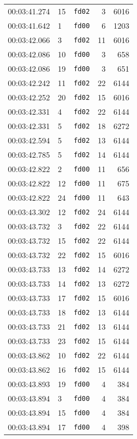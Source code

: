 \documentclass{article}
\begin{document}
\begin{longtable}{lllrr}
00:03:41.274 & 15 & \texttt{fd02} & 3 & 6016 \\
00:03:41.642 & 1 & \texttt{fd00} & 6 & 1203 \\
00:03:42.066 & 3 & \texttt{fd02} & 11 & 6016 \\
00:03:42.086 & 10 & \texttt{fd00} & 3 & 658 \\
00:03:42.086 & 19 & \texttt{fd00} & 3 & 651 \\
00:03:42.242 & 11 & \texttt{fd02} & 22 & 6144 \\
00:03:42.252 & 20 & \texttt{fd02} & 15 & 6016 \\
00:03:42.331 & 4 & \texttt{fd02} & 22 & 6144 \\
00:03:42.331 & 5 & \texttt{fd02} & 18 & 6272 \\
00:03:42.594 & 5 & \texttt{fd02} & 13 & 6144 \\
00:03:42.785 & 5 & \texttt{fd02} & 14 & 6144 \\
00:03:42.822 & 2 & \texttt{fd00} & 11 & 656 \\
00:03:42.822 & 12 & \texttt{fd00} & 11 & 675 \\
00:03:42.822 & 24 & \texttt{fd00} & 11 & 643 \\
00:03:43.302 & 12 & \texttt{fd02} & 24 & 6144 \\
00:03:43.732 & 3 & \texttt{fd02} & 22 & 6144 \\
00:03:43.732 & 15 & \texttt{fd02} & 22 & 6144 \\
00:03:43.732 & 22 & \texttt{fd02} & 15 & 6016 \\
00:03:43.733 & 13 & \texttt{fd02} & 14 & 6272 \\
00:03:43.733 & 14 & \texttt{fd02} & 13 & 6272 \\
00:03:43.733 & 17 & \texttt{fd02} & 15 & 6016 \\
00:03:43.733 & 18 & \texttt{fd02} & 13 & 6144 \\
00:03:43.733 & 21 & \texttt{fd02} & 13 & 6144 \\
00:03:43.733 & 23 & \texttt{fd02} & 15 & 6144 \\
00:03:43.862 & 10 & \texttt{fd02} & 22 & 6144 \\
00:03:43.862 & 16 & \texttt{fd02} & 15 & 6144 \\
00:03:43.893 & 19 & \texttt{fd00} & 4 & 384 \\
00:03:43.894 & 3 & \texttt{fd00} & 4 & 384 \\
00:03:43.894 & 15 & \texttt{fd00} & 4 & 384 \\
00:03:43.894 & 17 & \texttt{fd00} & 4 & 398 \\

\end{longtable}
\end{document}
